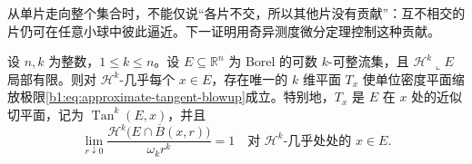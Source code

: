 从单片走向整个集合时，不能仅说“各片不交，所以其他片没有贡献”：互不相交的片仍可在任意小球中彼此逼近。下一证明用奇异测度微分定理控制这种贡献。

\begin{theorem}\label{b1:thm:rectifiable-density-tangent}
设 \(n,k\) 为整数，\(1\leq k\leq n\)。设 \(E\subseteq\mathbb R^n\) 为 Borel 的可数 \(k\)-可整流集，且 \(\mathcal H^k\llcorner E\) 局部有限。则对 \(\mathcal H^k\)-几乎每个 \(x\in E\)，存在唯一的 \(k\) 维平面 \(T_x\) 使单位密度平面缩放极限\eqref{b1:eq:approximate-tangent-blowup}成立。特别地，\(T_x\) 是 \(E\) 在 \(x\) 处的近似切平面，记为 \(\operatorname{Tan}^k(E,x)\)，并且
\[
 \lim_{r\downarrow0}
 \frac{\mathcal H^k\bigl(E\cap\overline B(x,r)\bigr)}
      {\omega_k r^k}=1
 \quad\text{对 }\mathcal H^k\text{-几乎处处的 }x\in E.
\]
\end{theorem}
